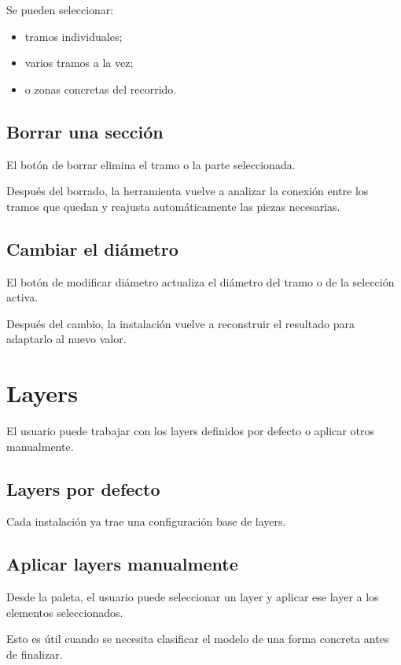 \documentclass[12pt,a4paper]{article}
\begin{document}
Se pueden seleccionar:

\begin{itemize}
\item tramos individuales;
\item varios tramos a la vez;
\item o zonas concretas del recorrido.
\end{itemize}

\subsection{Borrar una sección}

El botón de borrar elimina el tramo o la parte seleccionada.

Después del borrado, la herramienta vuelve a analizar la conexión entre los tramos que quedan y reajusta automáticamente las piezas necesarias.

\subsection{Cambiar el diámetro}

El botón de modificar diámetro actualiza el diámetro del tramo o de la selección activa.

Después del cambio, la instalación vuelve a reconstruir el resultado para adaptarlo al nuevo valor.

\section{Layers}

El usuario puede trabajar con los layers definidos por defecto o aplicar otros manualmente.

\subsection{Layers por defecto}

Cada instalación ya trae una configuración base de layers.

\subsection{Aplicar layers manualmente}

Desde la paleta, el usuario puede seleccionar un layer y aplicar ese layer a los elementos seleccionados.

Esto es útil cuando se necesita clasificar el modelo de una forma concreta antes de finalizar.
\end{document}
